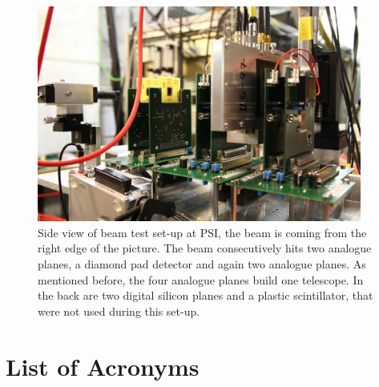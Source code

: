 \documentclass[british,11pt,a4paper]{memoir}
\begin{document}
\begin{figure}[ht]
	\centering
	\includegraphics[width=0.95\textwidth]{setup/fullsetup1}
	\caption{Side view of beam test set-up at \ac{PSI}, the beam is coming from the right edge of the picture. The beam consecutively hits two analogue planes, a diamond pad detector and again two analogue planes. As mentioned before, the four analogue planes build one telescope. In the back are two digital silicon planes and a plastic scintillator, that were not used during this set-up.}
	\label{sdut2}
\end{figure}\no
\chapter*{List of Acronyms}


% 
\end{document}
